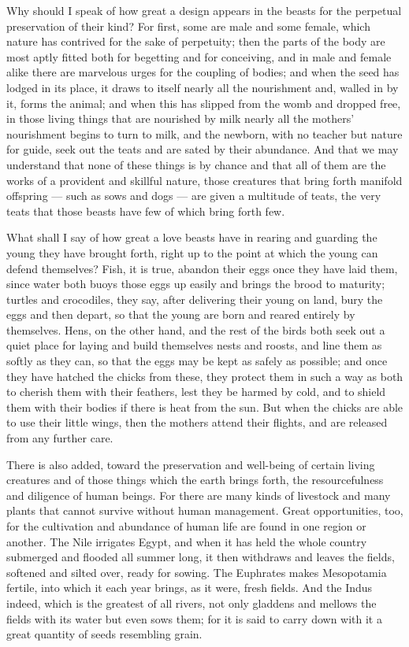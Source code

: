  Why should I speak of how great a design appears in the beasts for the perpetual preservation of their kind? For first, some are male and some female, which nature has contrived for the sake of perpetuity; then the parts of the body are most aptly fitted both for begetting and for conceiving, and in male and female alike there are marvelous urges for the coupling of bodies; and when the seed has lodged in its place, it draws to itself nearly all the nourishment and, walled in by it, forms the animal; and when this has slipped from the womb and dropped free, in those living things that are nourished by milk nearly all the mothers' nourishment begins to turn to milk, and the newborn, with no teacher but nature for guide, seek out the teats and are sated by their abundance. And that we may understand that none of these things is by chance and that all of them are the works of a provident and skillful nature, those creatures that bring forth manifold offspring — such as sows and dogs — are given a multitude of teats, the very teats that those beasts have few of which bring forth few.

 What shall I say of how great a love beasts have in rearing and guarding the young they have brought forth, right up to the point at which the young can defend themselves? Fish, it is true, abandon their eggs once they have laid them, since water both buoys those eggs up easily and brings the brood to maturity; turtles and crocodiles, they say, after delivering their young on land, bury the eggs and then depart, so that the young are born and reared entirely by themselves. Hens, on the other hand, and the rest of the birds both seek out a quiet place for laying and build themselves nests and roosts, and line them as softly as they can, so that the eggs may be kept as safely as possible; and once they have hatched the chicks from these, they protect them in such a way as both to cherish them with their feathers, lest they be harmed by cold, and to shield them with their bodies if there is heat from the sun. But when the chicks are able to use their little wings, then the mothers attend their flights, and are released from any further care.

 There is also added, toward the preservation and well-being of certain living creatures and of those things which the earth brings forth, the resourcefulness and diligence of human beings. For there are many kinds of livestock and many plants that cannot survive without human management. Great opportunities, too, for the cultivation and abundance of human life are found in one region or another. The Nile irrigates Egypt, and when it has held the whole country submerged and flooded all summer long, it then withdraws and leaves the fields, softened and silted over, ready for sowing. The Euphrates makes Mesopotamia fertile, into which it each year brings, as it were, fresh fields. And the Indus indeed, which is the greatest of all rivers, not only gladdens and mellows the fields with its water but even sows them; for it is said to carry down with it a great quantity of seeds resembling grain.

